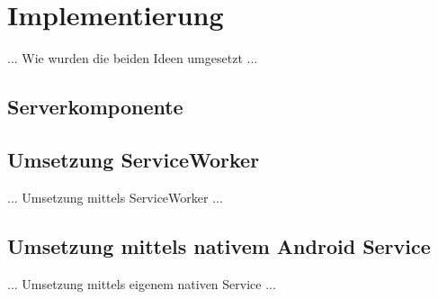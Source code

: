 \section{Implementierung}

... Wie wurden die beiden Ideen umgesetzt ...

\subsection{Serverkomponente}

\subsection{Umsetzung ServiceWorker}

... Umsetzung mittels ServiceWorker ...

\subsection{Umsetzung mittels nativem Android Service}

... Umsetzung mittels eigenem nativen Service ...
